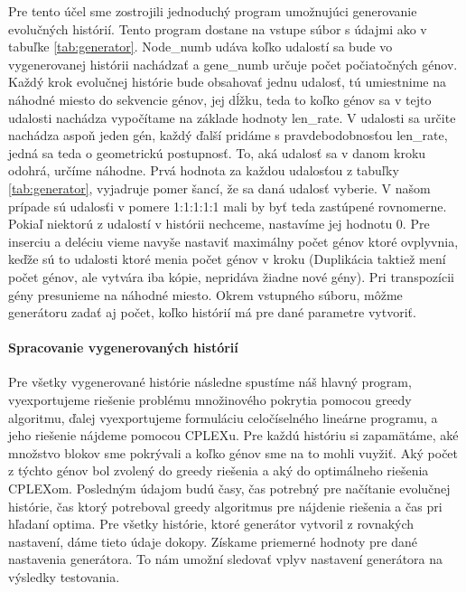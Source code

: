 Pre tento účel sme zostrojili jednoduchý program umožnujúci generovanie evolučných histórií.
Tento program dostane na vstupe súbor s údajmi ako v tabuľke \ref{tab:generator}. Node\_numb udáva koľko udalostí sa bude vo vygenerovanej histórii nachádzať
a gene\_numb určuje počet počiatočných génov. Každý krok evolučnej histórie bude obsahovať jednu udalosť, tú umiestnime na náhodné miesto do sekvencie génov,
jej dĺžku, teda to koľko génov sa v tejto udalosti nachádza vypočítame na základe hodnoty len\_rate. V udalosti sa určite nachádza aspoň jeden gén,
každý ďalší pridáme s pravdebodobnosťou len\_rate, jedná sa teda o geometrickú postupnosť. To, aká udalosť sa v danom kroku odohrá, určíme náhodne.
Prvá hodnota za každou udalosťou z tabuľky \ref{tab:generator}, vyjadruje pomer šancí, že sa daná udalosť vyberie. V našom prípade sú udalosťi v pomere 1:1:1:1:1 mali by byť teda zastúpené rovnomerne.
Pokiaľ niektorú z udalostí v histórii nechceme, nastavíme jej hodnotu 0. Pre inserciu a deléciu vieme navyše nastaviť maximálny počet génov ktoré ovplyvnia, 
keďže sú to udalosti ktoré menia počet génov v kroku (Duplikácia taktiež mení počet génov, ale vytvára iba kópie, nepridáva žiadne nové gény).
Pri transpozícii gény presunieme na náhodné miesto.
Okrem vstupného súboru, môžme generátoru zadať aj počet, koľko histórií má pre dané parametre vytvoriť.
\paragraph{Spracovanie vygenerovaných histórií}
Pre všetky vygenerované histórie následne spustíme náš hlavný program, vyexportujeme riešenie problému množinového pokrytia pomocou greedy algoritmu,
ďalej vyexportujeme formuláciu celočíselného lineárne programu, a jeho riešenie nájdeme pomocou CPLEXu.
Pre každú históriu si zapamätáme, aké množstvo blokov sme pokrývali a koľko génov sme na to mohli vuyžiť.
Aký počet z týchto génov bol zvolený do greedy riešenia a aký do optimálneho riešenia CPLEXom.
Posledným údajom budú časy, čas potrebný pre načítanie evolučnej histórie, čas ktorý potreboval greedy algoritmus pre nájdenie riešenia a čas pri hľadaní optima.
Pre všetky histórie, ktoré generátor vytvoril z rovnakých nastavení, dáme tieto údaje dokopy. Získame priemerné hodnoty pre dané nastavenia generátora. 
To nám umožní sledovať vplyv nastavení generátora na výsledky testovania.
